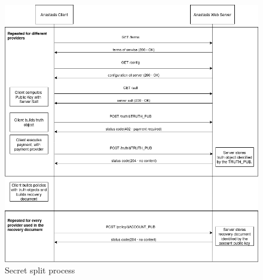 \begin{figure}[H]
	\centering
		\includegraphics[scale=0.5]{images/secret_split.png}
	\caption{Secret split process}
	\label{fig:secret_split}
\end{figure}
\newpage
